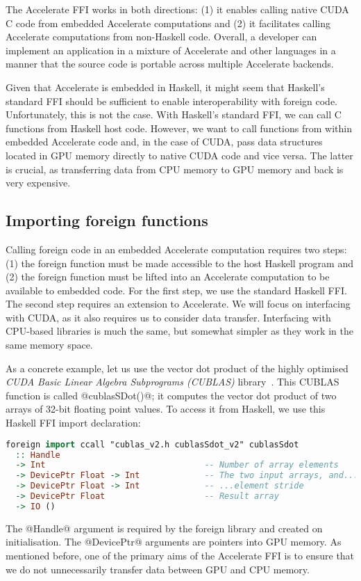 The Accelerate FFI works in both directions: (1) it enables calling native CUDA C code from embedded Accelerate computations and (2) it facilitates calling Accelerate computations from non-Haskell code. Overall, a developer can implement an application in a mixture of Accelerate and other languages in a manner that the source code is portable across multiple Accelerate backends.

Given that Accelerate is embedded in Haskell, it might seem  that Haskell's standard FFI should be sufficient to enable interoperability with foreign code. Unfortunately, this is not the case. With Haskell's standard FFI, we can call C functions from Haskell host code. However, we want to call functions from within embedded Accelerate code and, in the case of CUDA, pass data structures located in GPU memory directly to native CUDA code and vice versa. The latter is crucial, as transferring data from CPU memory to GPU memory and back is very expensive.

\subsection{Importing foreign functions}
\label{sec:foreign-import}

Calling foreign code in an embedded Accelerate computation requires two steps: (1) the foreign function must be made accessible to the host Haskell program and (2) the foreign function must be lifted into an Accelerate computation to be available to embedded code. For the first step, we use the standard Haskell FFI. The second step requires an extension to Accelerate. We will focus on interfacing with CUDA, as it also requires us to consider data transfer. Interfacing with CPU-based libraries is much the same, but somewhat simpler as they work in the same memory space.

As a concrete example, let us use the vector dot product of the highly optimised \emph{CUDA Basic Linear Algebra Subprograms (CUBLAS)} library~\cite{cublas}. This CUBLAS function is called @cublasSDot()@; it computes the vector dot product of two arrays of 32-bit floating point values. To access it from Haskell, we use this Haskell FFI import declaration:
%
\begin{lstlisting}[language=haskell]
foreign import ccall "cublas_v2.h cublasSdot_v2" cublasSdot
  :: Handle
  -> Int                                -- Number of array elements
  -> DevicePtr Float -> Int             -- The two input arrays, and...
  -> DevicePtr Float -> Int             -- ...element stride
  -> DevicePtr Float                    -- Result array
  -> IO ()
\end{lstlisting}
%
The @Handle@ argument is required by the foreign library and created on
initialisation. The @DevicePtr@ arguments are pointers into GPU memory. As mentioned before, one of the primary aims of the Accelerate FFI is to ensure that we do not unnecessarily transfer data between GPU and CPU memory.

